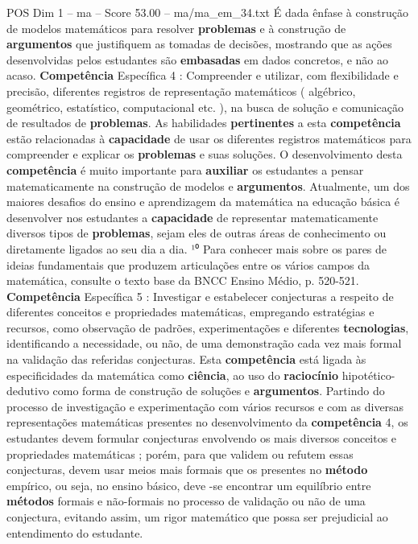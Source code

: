 \begin{textsample}{POS Dim 1 – ma – Score 53.00 – ma/ma\_em\_34.txt}
É dada ênfase à construção de modelos matemáticos para resolver \textbf{problemas} e à construção de \textbf{argumentos} que justifiquem as tomadas de decisões, mostrando que as ações desenvolvidas pelos estudantes são \textbf{embasadas} em dados concretos, e não ao acaso. \textbf{Competência} Específica 4 : Compreender e utilizar, com flexibilidade e precisão, diferentes registros de representação matemáticos ( algébrico, geométrico, estatístico, computacional etc. ), na busca de solução e comunicação de resultados de \textbf{problemas}.
As habilidades \textbf{pertinentes} a esta \textbf{competência} estão relacionadas à \textbf{capacidade} de usar os diferentes registros matemáticos para compreender e explicar os \textbf{problemas} e suas soluções.
O desenvolvimento desta \textbf{competência} é muito importante para \textbf{auxiliar} os estudantes a pensar matematicamente na construção de modelos e \textbf{argumentos}.
Atualmente, um dos maiores desafios do ensino e aprendizagem da matemática na educação básica é desenvolver nos estudantes a \textbf{capacidade} de representar matematicamente diversos tipos de \textbf{problemas}, sejam eles de outras áreas de conhecimento ou diretamente ligados ao seu dia a dia. ¹⁰ Para conhecer mais sobre os pares de ideias fundamentais que produzem articulações entre os vários campos da matemática, consulte o texto base da BNCC Ensino Médio, p. 520-521. \textbf{Competência} Específica 5 : Investigar e estabelecer conjecturas a respeito de diferentes conceitos e propriedades matemáticas, empregando estratégias e recursos, como observação de padrões, experimentações e diferentes \textbf{tecnologias}, identificando a necessidade, ou não, de uma demonstração cada vez mais formal na validação das referidas conjecturas.
Esta \textbf{competência} está ligada às especificidades da matemática como \textbf{ciência}, ao uso do \textbf{raciocínio} hipotético-dedutivo como forma de construção de soluções e \textbf{argumentos}.
Partindo do processo de investigação e experimentação com vários recursos e com as diversas representações matemáticas presentes no desenvolvimento da \textbf{competência} 4, os estudantes devem formular conjecturas envolvendo os mais diversos conceitos e propriedades matemáticas ; porém, para que validem ou refutem essas conjecturas, devem usar meios mais formais que os presentes no \textbf{método} empírico, ou seja, no ensino básico, deve -se encontrar um equilíbrio entre \textbf{métodos} formais e não-formais no processo de validação ou não de uma conjectura, evitando assim, um rigor matemático que possa ser prejudicial ao entendimento do estudante.

\end{textsample}
